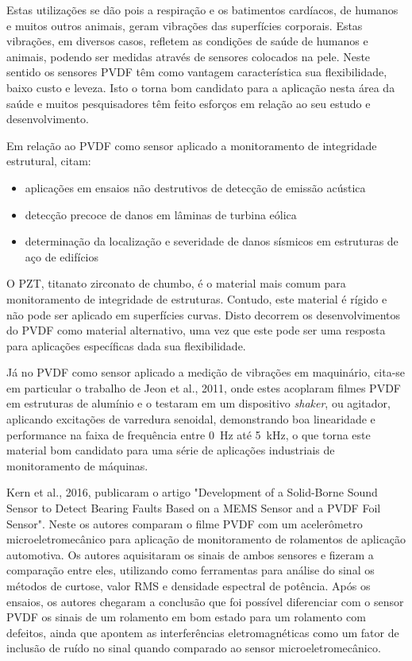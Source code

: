 \documentclass[
	12pt,				
	oneside,			
	a4paper,			
	english,			
	brazil,			
	]{abntex2ppgsi}
\begin{document}
Estas utilizações se dão pois a respiração e os batimentos cardíacos, de humanos e muitos outros animais, geram vibrações das superfícies corporais. Estas vibrações, em diversos casos, refletem as condições de saúde de humanos e animais, podendo ser medidas através de sensores colocados na pele. Neste sentido os sensores PVDF têm como vantagem característica sua flexibilidade, baixo custo e leveza. Isto o torna bom candidato para a aplicação nesta área da saúde e muitos pesquisadores têm feito esforços em relação ao seu estudo e desenvolvimento.

Em relação ao PVDF como sensor aplicado a monitoramento de integridade estrutural, citam:

\begin{itemize}
	\item aplicações em ensaios não destrutivos de detecção de emissão acústica
	\item detecção precoce de danos em lâminas de turbina eólica 
	\item determinação da localização e severidade de danos sísmicos em estruturas de aço de edifícios
\end{itemize}

O PZT, titanato zirconato de chumbo, é o material mais comum para monitoramento de integridade de estruturas. Contudo, este material é rígido e não pode ser aplicado em superfícies curvas. Disto decorrem os desenvolvimentos do PVDF como material alternativo, uma vez que este pode ser uma resposta para aplicações específicas dada sua flexibilidade.

Já no PVDF como sensor aplicado a medição de vibrações em maquinário, cita-se em particular o trabalho de Jeon et al., 2011, onde estes acoplaram filmes PVDF em estruturas de alumínio e o testaram em um dispositivo \textit{shaker}, ou agitador, aplicando excitações de varredura senoidal, demonstrando boa linearidade e performance na faixa de frequência entre \SI{0}{\hertz} até \SI{5}{\kilo\hertz}, o que torna este material bom candidato para uma série de aplicações industriais de monitoramento de máquinas.

Kern et al., 2016, publicaram o artigo "Development of a Solid-Borne Sound Sensor
to Detect Bearing Faults Based on a MEMS Sensor and a PVDF Foil Sensor". Neste os autores comparam o filme PVDF com um acelerômetro microeletromecânico para aplicação de monitoramento de rolamentos de aplicação automotiva. Os autores aquisitaram os sinais de ambos sensores e fizeram a comparação entre eles, utilizando como ferramentas para análise do sinal os métodos de curtose, valor RMS e densidade espectral de potência. Após os ensaios, os autores chegaram a conclusão que foi possível diferenciar com o sensor PVDF os sinais de um rolamento em bom estado para um rolamento com defeitos, ainda que apontem as interferências eletromagnéticas como um fator de inclusão de ruído no sinal quando comparado ao sensor microeletromecânico.
\end{document}
